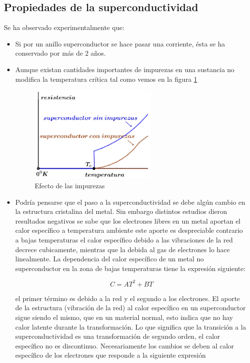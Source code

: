 \subsection{Propiedades de la superconductividad}

Se ha observado experimentalmente que:

\begin{itemize}
	\item Si por un anillo superconductor se hace pasar una corriente, ésta se ha conservado por más de 2 años.
	
	\item Aunque existan cantidades importantes de impurezas en una sustancia no modifica la temperatura crítica tal como vemos en la figura \ref{fig:49}
	
	
\begin{figure}[H]
    \centering
    \includegraphics[width=0.6\textwidth]{./Figures/fig49}
	\caption{Efecto de las impurezas}
	\label{fig:49}
\end{figure}
	
	
	
	\item Podría pensarse que el paso a la superconductividad se debe algún cambio en la estructura cristalina del metal. Sin embargo distintos estudios dieron resultados negativos se sabe que los electrones libres en un metal aportan el calor específico a temperatura ambiente este aporte es despreciable contrario a bajas temperaturas el calor específico debido a las
vibraciones de la red decrece cubicamente, mientras que la debida al gas de electrones lo hace linealmente. La dependencia del calor específico de un metal no superconductor en la zona de bajas temperaturas tiene la expresión siguiente:

\begin{equation}
	C= AT^{2}+BT
\end{equation}

el primer término es debido a la red y el segundo a los electrones. El aporte de la estructura (vibración de la red) al calor específico en un superconductor sigue siendo el mismo, que en un material normal, esto indica que no hay calor latente durante la transformación. Lo que significa que la transición a la superconductividad es una transformación de segundo orden, el calor específico no es discontinuo. Necesariamente los cambios se deben al calor específico de los electrones que responde a la siguiente expresión


\end{itemize}
